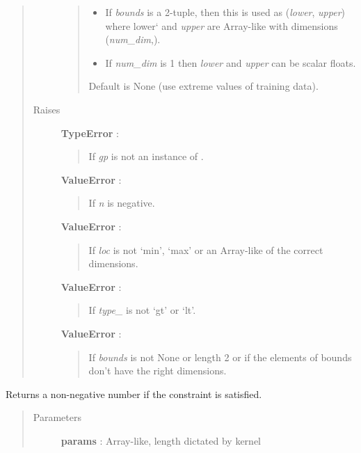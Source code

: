 \documentclass[letterpaper,10pt,english]{sphinxmanual}
\begin{document}
\begin{fulllineitems}
\begin{quote}
\begin{description}
\begin{quote}
\begin{itemize}
\item {} 
If \emph{bounds} is a 2-tuple, then this is used as (\emph{lower}, \emph{upper})
where lower{}` and \emph{upper} are Array-like with dimensions (\emph{num\_dim},).

\item {} 
If \emph{num\_dim} is 1 then \emph{lower} and \emph{upper} can be scalar floats.

\end{itemize}

Default is None (use extreme values of training data).
\end{quote}

\item[{Raises }] \leavevmode
\textbf{TypeError} :
\begin{quote}

If \emph{gp} is not an instance of {\hyperref[gptools:gptools.gaussian_process.GaussianProcess]{}}.
\end{quote}

\textbf{ValueError} :
\begin{quote}

If \emph{n} is negative.
\end{quote}

\textbf{ValueError} :
\begin{quote}

If \emph{loc} is not `min', `max' or an Array-like of the correct dimensions.
\end{quote}

\textbf{ValueError} :
\begin{quote}

If \emph{type\_} is not `gt' or `lt'.
\end{quote}

\textbf{ValueError} :
\begin{quote}

If \emph{bounds} is not None or length 2 or if the elements of bounds don't
have the right dimensions.
\end{quote}

\end{description}\end{quote}

\begin{fulllineitems}
\label{gptools:gptools.gaussian_process.Constraint.__call__}
Returns a non-negative number if the constraint is satisfied.
\begin{quote}\begin{description}
\item[{Parameters }] \leavevmode
\textbf{params} : Array-like, length dictated by kernel
\begin{quote}


\end{quote}
\end{description}
\end{quote}
\end{fulllineitems}
\end{fulllineitems}
\end{document}
